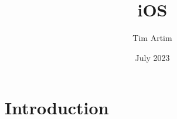 \documentclass{article}
\title{iOS}
\author{Tim Artim}
\date{July 2023}
\begin{document}
\maketitle

\section{Introduction}
\end{document}
